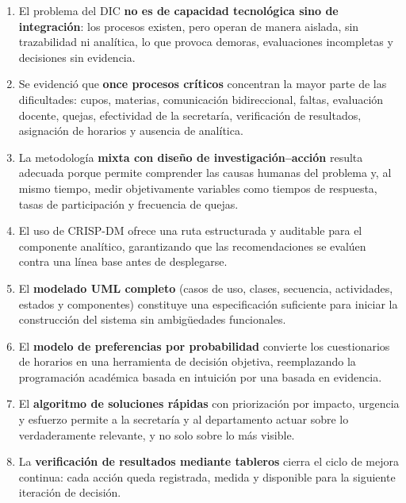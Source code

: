 \begin{cajaObjetivo}
\begin{enumerate}[leftmargin=1.2cm, itemsep=4pt]
  \item El problema del \ac{DIC} \textbf{no es de capacidad tecnológica sino de
        integración}: los procesos existen, pero operan de manera aislada, sin
        trazabilidad ni analítica, lo que provoca demoras, evaluaciones
        incompletas y decisiones sin evidencia.

  \item Se evidenció que \textbf{once procesos críticos} concentran la mayor
        parte de las dificultades: cupos, materias, comunicación bidireccional,
        faltas, evaluación docente, quejas, efectividad de la secretaría,
        verificación de resultados, asignación de horarios y ausencia de
        analítica.

  \item La metodología \textbf{mixta con diseño de investigación--acción} resulta
        adecuada porque permite comprender las causas humanas del problema y, al
        mismo tiempo, medir objetivamente variables como tiempos de respuesta,
        tasas de participación y frecuencia de quejas.

  \item El uso de \ac{CRISP-DM} ofrece una ruta estructurada y auditable para el
        componente analítico, garantizando que las recomendaciones se evalúen
        contra una línea base antes de desplegarse.

  \item El \textbf{modelado \ac{UML} completo} (casos de uso, clases, secuencia,
        actividades, estados y componentes) constituye una especificación
        suficiente para iniciar la construcción del sistema sin ambigüedades
        funcionales.

  \item El \textbf{modelo de preferencias por probabilidad} convierte los
        cuestionarios de horarios en una herramienta de decisión objetiva,
        reemplazando la programación académica basada en intuición por una
        basada en evidencia.

  \item El \textbf{algoritmo de soluciones rápidas} con priorización por
        impacto, urgencia y esfuerzo permite a la secretaría y al departamento
        actuar sobre lo verdaderamente relevante, y no solo sobre lo más
        visible.

  \item La \textbf{verificación de resultados mediante tableros} cierra el ciclo
        de mejora continua: cada acción queda registrada, medida y disponible
        para la siguiente iteración de decisión.
\end{enumerate}
\end{cajaObjetivo}

